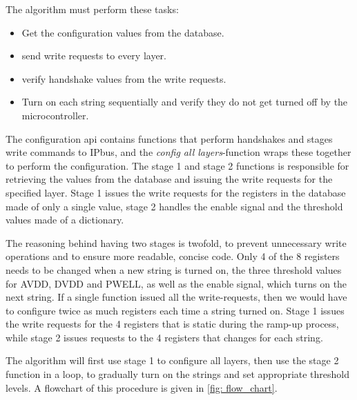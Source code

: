 \documentclass[main.tex]{subfiles}
\begin{document}
The algorithm must perform these tasks:

\begin{itemize}
    \item Get the configuration values from the database.
    \item send write requests to every layer.
    \item verify handshake values from the write requests.
    \item Turn on each string sequentially and verify they do not get turned off by the microcontroller.
\end{itemize}

The configuration \gls{api} contains functions that perform handshakes and stages write commands to IPbus, and the \textit{config all layers}-function wraps these together to perform the configuration. The stage 1 and stage 2 functions is responsible for retrieving the values from the database and issuing the write requests for the specified layer. Stage 1 issues the write requests for the registers in the database made of only a single value, stage 2 handles the enable signal and the threshold values made of a dictionary.

The reasoning behind having two stages is twofold, to prevent unnecessary write operations and to ensure more readable, concise code. Only 4 of the 8 registers needs to be changed when a new string is turned on, the three threshold values for AVDD, DVDD and PWELL, as well as the enable signal, which turns on the next string. If a single function issued all the write-requests, then we would have to configure twice as much registers each time a string turned on. Stage 1 issues the write requests for the 4 registers that is static during the ramp-up process, while stage 2 issues requests to the 4 registers that changes for each string.

The algorithm will first use stage 1 to configure all layers, then use the stage 2 function in a loop, to gradually turn on the strings and set appropriate threshold levels. A flowchart of this procedure is given in \autoref{fig: flow_chart}.
\end{document}
